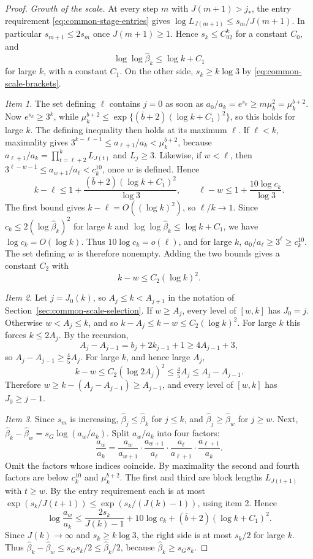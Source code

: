 \begin{proof}
\emph{Growth of the scale.} At every step $m$ with $J(m+1)>j_*$, the
entry requirement \eqref{eq:common-stage-entries} gives
$\log L_{J(m+1)}\le s_m/J(m+1)$. In particular $s_{m+1}\le2s_m$ once
$J(m+1)\ge1$. Hence $s_k\le C_02^k$ for a constant $C_0$, and
\[
 \log\log\widehat\beta_k\le\log k+C_1
\]
for large $k$, with a constant $C_1$. On the other side,
$s_k\ge k\log3$ by \eqref{eq:common-scale-brackets}.

\emph{Item 1.} The set defining $\ell$ contains $j=0$ as soon as
$a_0/a_k=e^{s_k}\ge m\mu_k^2=\mu_k^{b+2}$. Now
$e^{s_k}\ge3^k$, while
$\mu_k^{b+2}\le\exp\{(\bar b+2)(\log k+C_1)^2\}$, so this holds for large
$k$. The defining inequality then holds at its maximum $\ell$. If $\ell<k$, maximality gives
$3^{k-\ell-1}\le a_{\ell+1}/a_k<\mu_k^{b+2}$, because
$a_{\ell+1}/a_k=\prod_{t=\ell+2}^kL_{J(t)}$ and $L_j\ge3$. Likewise, if
$w<\ell$, then $3^{\ell-w-1}\le a_{w+1}/a_\ell<c_k^{10}$, once $w$ is
defined. Hence
\[
 k-\ell\le1+\frac{(\bar b+2)(\log k+C_1)^2}{\log3},\qquad
 \ell-w\le1+\frac{10\log c_k}{\log3}.
\]
The first bound gives $k-\ell=O((\log k)^2)$, so $\ell/k\to1$.
Since $c_k\le2(\log\widehat\beta_k)^2$ for large $k$ and
$\log\log\widehat\beta_k\le\log k+C_1$, we have
$\log c_k=O(\log k)$. Thus $10\log c_k=o(\ell)$, and for large $k$,
$a_0/a_\ell\ge3^\ell\ge c_k^{10}$. The set defining $w$ is therefore
nonempty. Adding the two bounds gives a constant $C_2$ with
\[
 k-w\le C_2(\log k)^2 .
\]

\emph{Item 2.} Let $j=J_0(k)$, so $A_j\le k<A_{j+1}$ in the notation of
Section~\ref{sec:common-scale-selection}. If $w\ge A_j$, every level of
$[w,k]$ has $J_0=j$. Otherwise $w<A_j\le k$, and so
$k-A_j\le k-w\le C_2(\log k)^2$. For large $k$ this forces
$k\le2A_j$. By the recursion,
\[
 A_j-A_{j-1}=b_j+2k_{j-1}+1\ge4A_{j-1}+3 ,
\]
so $A_j-A_{j-1}\ge\tfrac45A_j$. For large $k$, and hence large $A_j$,
\[
 k-w\le C_2(\log2A_j)^2\le\tfrac45A_j\le A_j-A_{j-1}.
\]
Therefore $w\ge k-(A_j-A_{j-1})\ge A_{j-1}$, and every level of $[w,k]$
has $J_0\ge j-1$.

\emph{Item 3.} Since $s_m$ is increasing, $\widehat\beta_j\le\widehat\beta_k$
for $j\le k$, and $\widehat\beta_j\ge\widehat\beta_w$ for $j\ge w$. Next,
$\widehat\beta_k-\widehat\beta_w=s_G\log(a_w/a_k)$. Split $a_w/a_k$ into
four factors:
\[
 \frac{a_w}{a_k}
 =\frac{a_w}{a_{w+1}}\cdot\frac{a_{w+1}}{a_\ell}\cdot
  \frac{a_\ell}{a_{\ell+1}}\cdot\frac{a_{\ell+1}}{a_k}.
\]
Omit the factors whose indices coincide. By maximality the second and
fourth factors are below $c_k^{10}$ and $\mu_k^{b+2}$. The first and third
are block lengths $L_{J(t+1)}$ with $t\ge w$. By the entry requirement
each is at most $\exp(s_k/J(t+1))\le\exp(s_k/(J(k)-1))$, using item 2.
Hence
\[
 \log\frac{a_w}{a_k}\le\frac{2s_k}{J(k)-1}+10\log c_k
   +(\bar b+2)(\log k+C_1)^2 .
\]
Since $J(k)\to\infty$ and $s_k\ge k\log3$, the right side is at most
$s_k/2$ for large $k$. Thus
$\widehat\beta_k-\widehat\beta_w\le s_Gs_k/2\le\widehat\beta_k/2$,
because $\widehat\beta_k\ge s_Gs_k$.
\end{proof}

